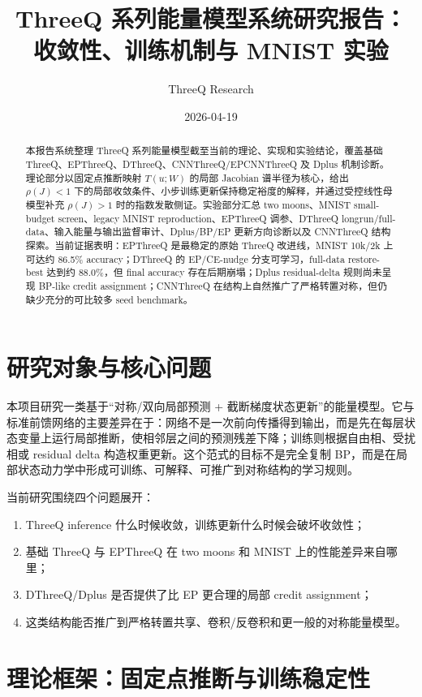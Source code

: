 \documentclass[UTF8,zihao=-4]{ctexart}
\title{ThreeQ 系列能量模型系统研究报告：收敛性、训练机制与 MNIST 实验}
\author{ThreeQ Research}
\date{2026-04-19}
\begin{document}
        \maketitle

        \begin{abstract}
        本报告系统整理 ThreeQ 系列能量模型截至当前的理论、实现和实验结论，覆盖基础 ThreeQ、EPThreeQ、DThreeQ、CNNThreeQ/EPCNNThreeQ 及 Dplus 机制诊断。理论部分以固定点推断映射 $T(u;W)$ 的局部 Jacobian 谱半径为核心，给出 $\rho(J)<1$ 下的局部收敛条件、小步训练更新保持稳定裕度的解释，并通过受控线性母模型补充 $\rho(J)>1$ 时的指数发散侧证。实验部分汇总 two moons、MNIST small-budget screen、legacy MNIST reproduction、EPThreeQ 调参、DThreeQ longrun/full-data、输入能量与输出监督审计、Dplus/BP/EP 更新方向诊断以及 CNNThreeQ 结构探索。当前证据表明：EPThreeQ 是最稳定的原始 ThreeQ 改进线，MNIST 10k/2k 上可达约 86.5\% accuracy；DThreeQ 的 EP/CE-nudge 分支可学习，full-data restore-best 达到约 88.0\%，但 final accuracy 存在后期崩塌；Dplus residual-delta 规则尚未呈现 BP-like credit assignment；CNNThreeQ 在结构上自然推广了严格转置对称，但仍缺少充分的可比较多 seed benchmark。
        \end{abstract}

        \section{研究对象与核心问题}

        本项目研究一类基于“对称/双向局部预测 + 截断梯度状态更新”的能量模型。它与标准前馈网络的主要差异在于：网络不是一次前向传播得到输出，而是先在每层状态变量上运行局部推断，使相邻层之间的预测残差下降；训练则根据自由相、受扰相或 residual delta 构造权重更新。这个范式的目标不是完全复制 BP，而是在局部状态动力学中形成可训练、可解释、可推广到对称结构的学习规则。

        当前研究围绕四个问题展开：
        \begin{enumerate}[leftmargin=2em]
        \item ThreeQ inference 什么时候收敛，训练更新什么时候会破坏收敛性；
        \item 基础 ThreeQ 与 EPThreeQ 在 two moons 和 MNIST 上的性能差异来自哪里；
        \item DThreeQ/Dplus 是否提供了比 EP 更合理的局部 credit assignment；
        \item 这类结构能否推广到严格转置共享、卷积/反卷积和更一般的对称能量模型。
        \end{enumerate}

        \section{理论框架：固定点推断与训练稳定性}
\end{document}
